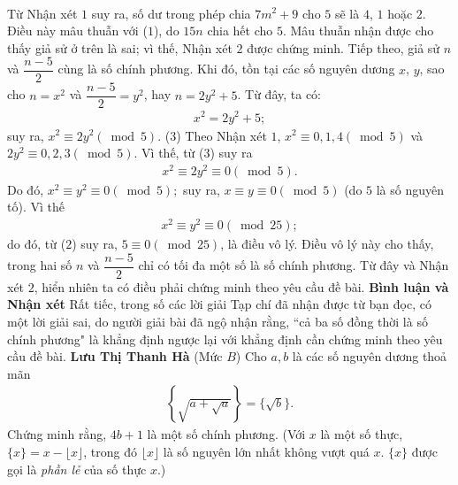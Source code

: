 \begin{multicols}{2}
\begin{align*}
	\end{align*}
	Từ Nhận xét $1$ suy ra, số dư trong phép chia $7m^2 + 9$  cho $5$ sẽ là $4$, $1$  hoặc $2$. Điều này mâu thuẫn với ($1$), do $15n$ chia hết cho $5$. Mâu thuẫn nhận được cho thấy giả sử ở trên là sai; vì thế, Nhận xét $2$ được chứng minh.
	\vskip 0.05cm
	Tiếp theo, giả sử $n$ và $\dfrac{n-5}{2}$  cùng là số chính phương. Khi đó, tồn tại các số nguyên dương $x$, $y$, sao cho $n = x^2$  và $\dfrac{n-5}{2} = y^2$,  hay \linebreak$n = 2y^2 + 5$.  Từ đây, ta có:
	\begin{align*}
		{x^2} = 2{y^2} + 5; \tag{$2$}
	\end{align*}
	suy ra, ${x^2} \equiv 2{y^2}\left( {\bmod 5} \right)$. \hfill ($3$)
	\vskip 0.05cm
	Theo Nhận xét $1$, ${x^2} \equiv 0,1,4\left( {\bmod 5} \right)$  và  $2{y^2} \equiv 0,2,3\left( {\bmod 5} \right)$.
	\vskip 0.05cm 
	Vì thế, từ ($3$) suy ra
	\begin{align*}
		{x^2} \equiv 2{y^2} \equiv 0\left( {\bmod 5} \right).
	\end{align*}
	Do đó, ${x^2} \equiv {y^2} \equiv 0\left( {\bmod 5} \right);$  suy ra, \linebreak $x \equiv y \equiv 0\left( {\bmod 5} \right)$  (do $5$ là số nguyên tố). Vì thế
	\begin{align*}
		{x^2} \equiv {y^2} \equiv 0\left( {\bmod 25} \right);
	\end{align*}
	do đó, từ ($2$) suy ra,  $5 \equiv 0\left( {\bmod 25} \right)$, là điều vô lý. Điều vô lý này cho thấy, trong hai số $n$ và $\dfrac{n-5}{2}$  chỉ có tối đa một số là số chính phương. Từ đây và Nhận xét $2$, hiển nhiên ta có điều phải chứng minh theo yêu cầu đề bài.
	\vskip 0.05cm
	\columnbreak
	\textbf{\color{thachthuctoanhoc}Bình luận và Nhận xét}
	\vskip 0.05cm
	Rất tiếc, trong số các lời giải Tạp chí đã nhận được từ bạn đọc, có một lời giải sai, do người giải bài đã ngộ nhận rằng, ``cả ba số đồng thời là số chính phương" là khẳng định ngược lại với khẳng định cần chứng minh theo yêu cầu đề bài.
	\vskip 0.05cm
	\hfill	\textbf{\color{thachthuctoanhoc}Lưu Thị Thanh Hà}
	\vskip 0.05cm
	{}
	(Mức $B$) Cho $a,b$ là các số nguyên dương thoả mãn
	\begin{align*}
		\left\{ \sqrt{a+\sqrt{a}}\right\}=\{\sqrt b\}.
	\end{align*}
	Chứng minh rằng, $4b+1$ là một số chính phương.
	\vskip 0.05cm
	(Với $x$ là một số thực, $\{x\}=x-\lfloor x\rfloor$, trong đó $\lfloor x\rfloor$ là số nguyên lớn nhất không vượt quá $x$. $\{x\}$ được gọi là {\it phần lẻ} của số thực $x$.)

\end{multicols}

